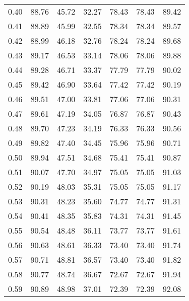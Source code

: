 \begin{tabular}{|c|c|c|c|c|c|c|}
      0.40 &     88.76 &     45.72 &      32.27 &   78.43 &      78.43 &         89.42 \\
      0.41 &     88.89 &     45.99 &      32.55 &   78.34 &      78.34 &         89.57 \\
      0.42 &     88.99 &     46.18 &      32.76 &   78.24 &      78.24 &         89.68 \\
      0.43 &     89.17 &     46.53 &      33.14 &   78.06 &      78.06 &         89.88 \\
      0.44 &     89.28 &     46.71 &      33.37 &   77.79 &      77.79 &         90.02 \\
      0.45 &     89.42 &     46.90 &      33.64 &   77.42 &      77.42 &         90.19 \\
      0.46 &     89.51 &     47.00 &      33.81 &   77.06 &      77.06 &         90.31 \\
      0.47 &     89.61 &     47.19 &      34.05 &   76.87 &      76.87 &         90.43 \\
      0.48 &     89.70 &     47.23 &      34.19 &   76.33 &      76.33 &         90.56 \\
      0.49 &     89.82 &     47.40 &      34.45 &   75.96 &      75.96 &         90.71 \\
      0.50 &     89.94 &     47.51 &      34.68 &   75.41 &      75.41 &         90.87 \\
      0.51 &     90.07 &     47.70 &      34.97 &   75.05 &      75.05 &         91.03 \\
      0.52 &     90.19 &     48.03 &      35.31 &   75.05 &      75.05 &         91.17 \\
      0.53 &     90.31 &     48.23 &      35.60 &   74.77 &      74.77 &         91.31 \\
      0.54 &     90.41 &     48.35 &      35.83 &   74.31 &      74.31 &         91.45 \\
      0.55 &     90.54 &     48.48 &      36.11 &   73.77 &      73.77 &         91.61 \\
      0.56 &     90.63 &     48.61 &      36.33 &   73.40 &      73.40 &         91.74 \\
      0.57 &     90.71 &     48.81 &      36.57 &   73.40 &      73.40 &         91.82 \\
      0.58 &     90.77 &     48.74 &      36.67 &   72.67 &      72.67 &         91.94 \\
      0.59 &     90.89 &     48.98 &      37.01 &   72.39 &      72.39 &         92.08 \\

\end{tabular}
